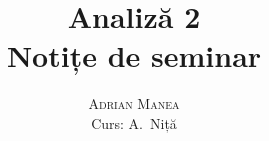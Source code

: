 \documentclass[12pt, a4paper]{book}
\begin{document}
\thispagestyle{empty}
\pagestyle{plain} %

\title{\huge\textbf{Analiză 2} \\ \Large{Notițe de seminar}}
\vspace{1cm}
\author{\Large\textsc{Adrian Manea} \\ \large{Curs: A.\ Niță}}

\maketitle

\tableofcontents

\setcounter{page}{1} %
















\renewcommand{\indexname}{Index}
\printindex



\nocite{*}
\end{document}
